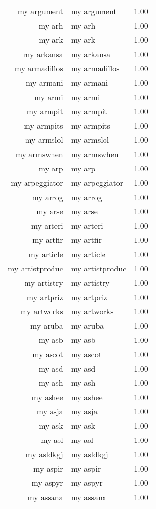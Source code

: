 \begin{table}[ht]
\begin{tabular}{rlr}
  my argument & my argument & 1.00 \\ 
  my arh & my arh & 1.00 \\ 
  my ark & my ark & 1.00 \\ 
  my arkansa & my arkansa & 1.00 \\ 
  my armadillos & my armadillos & 1.00 \\ 
  my armani & my armani & 1.00 \\ 
  my armi & my armi & 1.00 \\ 
  my armpit & my armpit & 1.00 \\ 
  my armpits & my armpits & 1.00 \\ 
  my armslol & my armslol & 1.00 \\ 
  my armswhen & my armswhen & 1.00 \\ 
  my arp & my arp & 1.00 \\ 
  my arpeggiator & my arpeggiator & 1.00 \\ 
  my arrog & my arrog & 1.00 \\ 
  my arse & my arse & 1.00 \\ 
  my arteri & my arteri & 1.00 \\ 
  my artfir & my artfir & 1.00 \\ 
  my article & my article & 1.00 \\ 
  my artistproduc & my artistproduc & 1.00 \\ 
  my artistry & my artistry & 1.00 \\ 
  my artpriz & my artpriz & 1.00 \\ 
  my artworks & my artworks & 1.00 \\ 
  my aruba & my aruba & 1.00 \\ 
  my asb & my asb & 1.00 \\ 
  my ascot & my ascot & 1.00 \\ 
  my asd & my asd & 1.00 \\ 
  my ash & my ash & 1.00 \\ 
  my ashee & my ashee & 1.00 \\ 
  my asja & my asja & 1.00 \\ 
  my ask & my ask & 1.00 \\ 
  my asl & my asl & 1.00 \\ 
  my asldkgj & my asldkgj & 1.00 \\ 
  my aspir & my aspir & 1.00 \\ 
  my aspyr & my aspyr & 1.00 \\ 
  my assana & my assana & 1.00 \\ 

\end{tabular}
\end{table}
